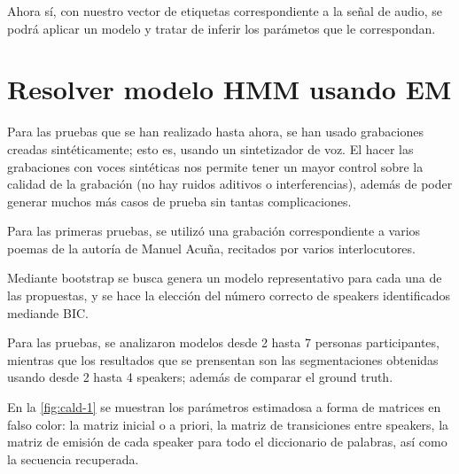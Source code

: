 Ahora sí, con nuestro vector de etiquetas correspondiente a la señal de audio, se podrá aplicar un modelo y tratar de inferir los parámetos que le correspondan.

\section{Resolver modelo HMM usando EM} 
\label{sec:sd-hmm-em}

Para las pruebas que se han realizado hasta ahora, se han usado grabaciones creadas sintéticamente; esto es, usando un sintetizador de voz. El hacer las grabaciones con voces sintéticas nos permite tener un mayor control sobre la calidad de la grabación (no hay ruidos aditivos o interferencias), además de poder generar muchos más casos de prueba sin tantas complicaciones.

Para las primeras pruebas, se utilizó una grabación correspondiente a varios poemas de la autoría de Manuel Acuña, recitados por varios interlocutores.

Mediante bootstrap se busca genera un modelo representativo para cada una de las propuestas, y  se hace la elección del número correcto de speakers identificados mediande BIC.

Para las pruebas, se analizaron modelos desde 2 hasta 7 personas participantes, mientras que los resultados que se prensentan son las segmentaciones obtenidas usando desde 2 hasta 4 speakers; además de comparar el ground truth.

En la \autoref{fig:cald-1} se muestran los parámetros estimadosa a forma de matrices en falso color: la matriz inicial o a priori, la matriz de transiciones entre speakers, la matriz de emisión de cada speaker para todo el diccionario de palabras, así como la secuencia recuperada.

